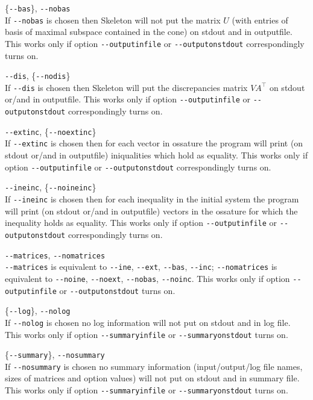 \documentclass{article}
\newcommand{\Skeleton}{{\sc Skeleton}\xspace}
\newcommand{\params}{\smallskip\hangindent=2\parindent}
\newcommand{\transpose}{^{\top}}
\begin{document}
\params \{\verb$--bas$\}, \verb$--nobas$ \\
  If \verb$--nobas$ is chosen then \Skeleton will not put 
  the matrix $U$ (with entries of basis of maximal subspace contained in the cone) 
  on stdout and in outputfile. 
  This works only if option 
  \verb$--outputinfile$ or \verb$--outputonstdout$ correspondingly turns on.

\params \verb$--dis$, \{\verb$--nodis$\} \\
  If \verb$--dis$ is chosen then \Skeleton will put 
  the discrepancies matrix $VA\transpose$ on stdout or/and in outputfile. 
  This works only if option 
  \verb$--outputinfile$ or \verb$--outputonstdout$ correspondingly turns on.

\params \verb$--extinc$, \{\verb$--noextinc$\} \\
  If \verb$--extinc$ is chosen then for each vector in ossature
  the program will print (on stdout or/and in outputfile)
  iniqualities which hold as equality. 
  This works only if option 
  \verb$--outputinfile$ or \verb$--outputonstdout$ correspondingly turns on.

\params \verb$--ineinc$, \{\verb$--noineinc$\} \\
  If \verb$--ineinc$ is chosen then for each inequality in the initial system
  the program will print (on stdout or/and in outputfile)
  vectors in the ossature for which the inequality holds as equality. 
  This works only if option 
  \verb$--outputinfile$ or \verb$--outputonstdout$ correspondingly turns on.

\params \verb$--matrices$, \verb$--nomatrices$ \\
  \verb$--matrices$ is equivalent to 
  \verb$--ine$, \verb$--ext$, \verb$--bas$, \verb$--inc$;
  \verb$--nomatrices$ is equivalent to 
  \verb$--noine$, \verb$--noext$, \verb$--nobas$, \verb$--noinc$. 
  This works only if option 
  \verb$--outputinfile$ or \verb$--outputonstdout$ turns on.
 
\params \{\verb$--log$\}, \verb$--nolog$ \\
  If \verb$--nolog$ is chosen no log information 
  will not put on stdout and in log file. 
  This works only if option 
  \verb$--summaryinfile$ or \verb$--summaryonstdout$ turns on.

\params \{\verb$--summary$\}, \verb$--nosummary$ \\
  If \verb$--nosummary$ is chosen no summary information 
  (input/output/log file names, sizes of matrices and option values) 
  will not put on stdout and in summary file. 
  This works only if option 
  \verb$--summaryinfile$ or \verb$--summaryonstdout$ turns on.
\end{document}
